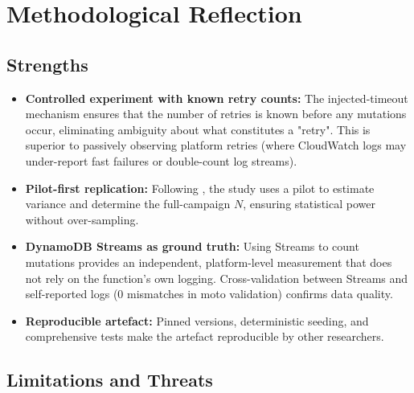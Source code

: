\section{Methodological Reflection}

\subsection{Strengths}

\begin{itemize}
    \item \textbf{Controlled experiment with known retry counts:} The injected-timeout mechanism ensures that the number of retries is known before any mutations occur, eliminating ambiguity about what constitutes a "retry". This is superior to passively observing platform retries (where CloudWatch logs may under-report fast failures or double-count log streams).
    
    \item \textbf{Pilot-first replication:} Following \citet{Wen2025Variance}, the study uses a pilot to estimate variance and determine the full-campaign $N$, ensuring statistical power without over-sampling.
    
    \item \textbf{DynamoDB Streams as ground truth:} Using Streams to count mutations provides an independent, platform-level measurement that does not rely on the function's own logging. Cross-validation between Streams and self-reported logs (0 mismatches in moto validation) confirms data quality.
    
    \item \textbf{Reproducible artefact:} Pinned versions, deterministic seeding, and comprehensive tests make the artefact reproducible by other researchers.
\end{itemize}

\subsection{Limitations and Threats}

